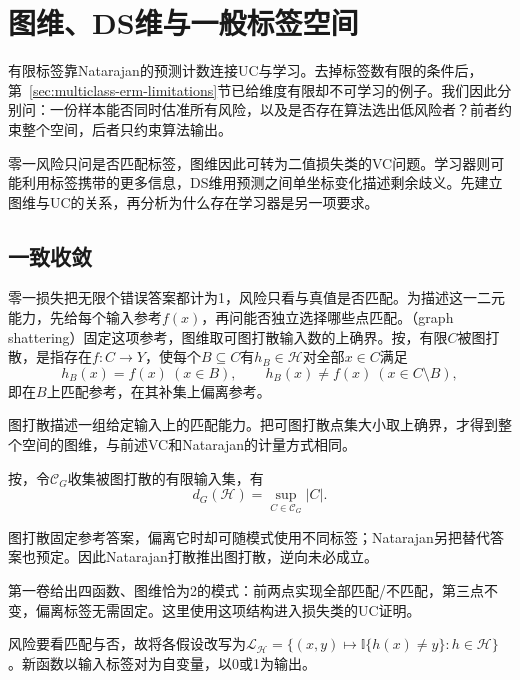 \section{图维、DS维与一般标签空间}
\label{sec:general-multiclass-dimensions}
\label{sec:multiclass-sample-complexity}
有限标签靠Natarajan的预测计数连接UC与学习。去掉标签数有限的条件后，第~\ref{sec:multiclass-erm-limitations}节已给维度有限却不可学习的例子。我们因此分别问：一份样本能否同时估准所有风险，以及是否存在算法选出低风险者？前者约束整个空间，后者只约束算法输出。

零一风险只问是否匹配标签，图维因此可转为二值损失类的VC问题。学习器则可能利用标签携带的更多信息，DS维用预测之间单坐标变化描述剩余歧义。先建立图维与UC的关系，再分析为什么存在学习器是另一项要求。

\subsection{一致收敛}

零一损失把无限个错误答案都计为1，风险只看与真值是否匹配。为描述这一二元能力，先给每个输入参考$f(x)$，再问能否独立选择哪些点匹配。（graph shattering）固定这项参考，图维取可图打散输入数的上确界。按，有限$C$被图打散，是指存在$f:C\to Y$，使每个$B\subseteq C$有$h_B\in\mathcal H$对全部$x\in C$满足
\[
 h_B(x)=f(x)\ (x\in B),\qquad h_B(x)\neq f(x)\ (x\in C\setminus B),
\]
即在$B$上匹配参考，在其补集上偏离参考。

图打散描述一组给定输入上的匹配能力。把可图打散点集大小取上确界，才得到整个空间的图维，与前述VC和Natarajan的计量方式相同。

按，令$\mathcal C_G$收集被图打散的有限输入集，有
\[
 d_G(\mathcal H)=\sup_{C\in\mathcal C_G}|C|.
\]

图打散固定参考答案，偏离它时却可随模式使用不同标签；Natarajan另把替代答案也预定。因此Natarajan打散推出图打散，逆向未必成立。

第一卷给出四函数、图维恰为2的模式：前两点实现全部匹配/不匹配，第三点不变，偏离标签无需固定。这里使用这项结构进入损失类的UC证明。

风险要看匹配与否，故将各假设改写为$\mathcal L_{\mathcal H}=\{(x,y)\mapsto\mathbb I\{h(x)\neq y\}:h\in\mathcal H\}$。新函数以输入标签对为自变量，以0或1为输出。

